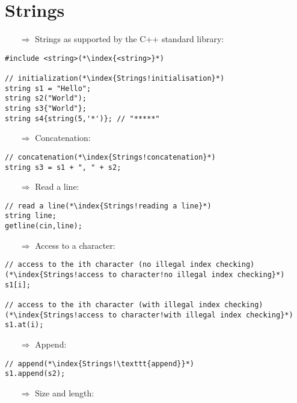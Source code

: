 \documentclass[10pt]{article}
\begin{document}
\section{Strings}
\small
\begin{enumerate}
\item[$\Rightarrow$] Strings as supported by the C++ standard library:
\end{enumerate}
\begin{lstlisting}
#include <string>(*\index{<string>}*)

// initialization(*\index{Strings!initialisation}*)
string s1 = "Hello";
string s2("World");
string s3{"World"};
string s4{string(5,'*')}; // "*****"
\end{lstlisting}
\begin{enumerate}
\item[$\Rightarrow$] Concatenation:
\end{enumerate}
\begin{lstlisting}
// concatenation(*\index{Strings!concatenation}*)
string s3 = s1 + ", " + s2;
\end{lstlisting}
\begin{enumerate}
\item[$\Rightarrow$] Read a line:
\end{enumerate}
\begin{lstlisting}
// read a line(*\index{Strings!reading a line}*)
string line;
getline(cin,line);
\end{lstlisting}
\begin{enumerate}
\item[$\Rightarrow$] Access to a character:
\end{enumerate}
\begin{lstlisting}
// access to the ith character (no illegal index checking)(*\index{Strings!access to character!no illegal index checking}*)
s1[i];

// access to the ith character (with illegal index checking)(*\index{Strings!access to character!with illegal index checking}*)
s1.at(i);
\end{lstlisting}
\begin{enumerate}
\item[$\Rightarrow$] Append:
\end{enumerate}
\begin{lstlisting}
// append(*\index{Strings!\texttt{append}}*)
s1.append(s2);
\end{lstlisting}
\begin{enumerate}
\item[$\Rightarrow$] Size and length:
\end{enumerate}
\end{document}

